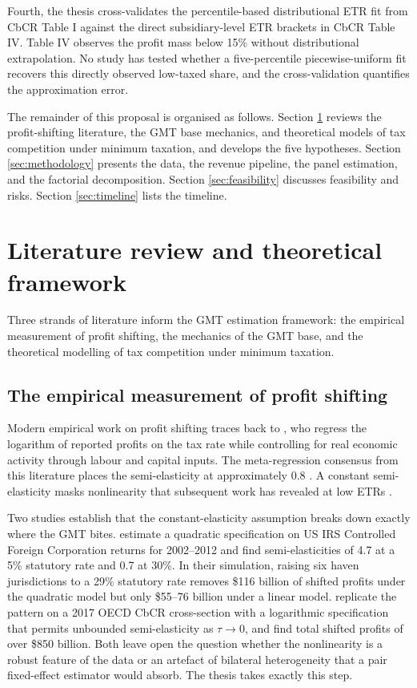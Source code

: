 \documentclass[11pt,a4paper]{article}
\begin{document}
Fourth, the thesis cross-validates the percentile-based distributional ETR fit from CbCR Table I against the direct subsidiary-level ETR brackets in CbCR Table IV\@. Table IV observes the profit mass below 15\% without distributional extrapolation. No study has tested whether a five-percentile piecewise-uniform fit recovers this directly observed low-taxed share, and the cross-validation quantifies the approximation error.

The remainder of this proposal is organised as follows. Section \ref{sec:litreview} reviews the profit-shifting literature, the GMT base mechanics, and theoretical models of tax competition under minimum taxation, and develops the five hypotheses. Section \ref{sec:methodology} presents the data, the revenue pipeline, the panel estimation, and the factorial decomposition. Section \ref{sec:feasibility} discusses feasibility and risks. Section \ref{sec:timeline} lists the timeline.
 
\section{Literature review and theoretical framework}\label{sec:litreview}

Three strands of literature inform the GMT estimation framework: the empirical measurement of profit shifting, the mechanics of the GMT base, and the theoretical modelling of tax competition under minimum taxation.

\subsection{The empirical measurement of profit shifting}

Modern empirical work on profit shifting traces back to \citet{hines1994}, who regress the logarithm of reported profits on the tax rate while controlling for real economic activity through labour and capital inputs. The meta-regression consensus from this literature places the semi-elasticity at approximately 0.8 \citep{heckemeyer2017}. A constant semi-elasticity masks nonlinearity that subsequent work has revealed at low ETRs \citep{dowd2017,garcia-bernardo2024}.

Two studies establish that the constant-elasticity assumption breaks down exactly where the GMT bites. \citet{dowd2017} estimate a quadratic specification on US IRS Controlled Foreign Corporation returns for 2002--2012 and find semi-elasticities of 4.7 at a 5\% statutory rate and 0.7 at 30\%. In their simulation, raising six haven jurisdictions to a 29\% statutory rate removes \$116 billion of shifted profits under the quadratic model but only \$55--76 billion under a linear model. \citet{garcia-bernardo2024} replicate the pattern on a 2017 OECD CbCR cross-section with a logarithmic specification that permits unbounded semi-elasticity as $\tau \to 0$, and find total shifted profits of over \$850 billion. Both leave open the question whether the nonlinearity is a robust feature of the data or an artefact of bilateral heterogeneity that a pair fixed-effect estimator would absorb. The thesis takes exactly this step.
\end{document}
